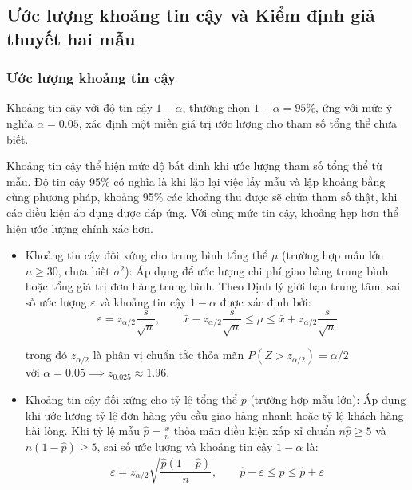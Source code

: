 	\subsection{Ước lượng khoảng tin cậy và Kiểm định giả thuyết hai mẫu}
	
	\subsubsection{Ước lượng khoảng tin cậy}
	
	Khoảng tin cậy với độ tin cậy $1 - \alpha$, thường chọn $1 - \alpha = 95\%$, ứng với mức ý nghĩa $\alpha = 0.05$, xác định một miền giá trị ước lượng cho tham số tổng thể chưa biết.
	
	Khoảng tin cậy thể hiện mức độ bất định khi ước lượng tham số tổng thể từ mẫu. Độ tin cậy 95\% có nghĩa là khi lặp lại việc lấy mẫu và lập khoảng bằng cùng phương pháp, khoảng 95\% các khoảng thu được sẽ chứa tham số thật, khi các điều kiện áp dụng được đáp ứng. Với cùng mức tin cậy, khoảng hẹp hơn thể hiện ước lượng chính xác hơn.
	
	\begin{itemize}
		\item Khoảng tin cậy đối xứng cho trung bình tổng thể $\mu$ (trường hợp mẫu lớn $n \ge 30$, chưa biết $\sigma^2$):
		Áp dụng để ước lượng chi phí giao hàng trung bình  hoặc tổng giá trị đơn hàng trung bình. Theo Định lý giới hạn trung tâm, sai số ước lượng $\varepsilon$ và khoảng tin cậy $1-\alpha$ được xác định bởi:
		\begin{equation}
			\varepsilon = z_{\alpha/2} \frac{s}{\sqrt{n}}, \qquad \bar{x} - z_{\alpha/2} \frac{s}{\sqrt{n}} \le \mu \le \bar{x} + z_{\alpha/2} \frac{s}{\sqrt{n}}
		\end{equation}
		\begin{center}
			trong đó $z_{\alpha/2}$ là phân vị chuẩn tắc thỏa mãn $P(Z > z_{\alpha/2}) = \alpha/2$ \\
			với $\alpha = 0.05 \implies z_{0.025} \approx 1.96$.
		\end{center}		
		
		
		\item Khoảng tin cậy đối xứng cho tỷ lệ tổng thể $p$ (trường hợp mẫu lớn):
		Áp dụng khi ước lượng tỷ lệ đơn hàng yêu cầu giao hàng nhanh hoặc tỷ lệ khách hàng hài lòng. Khi tỷ lệ mẫu $\hat{p} = \frac{x}{n}$ thỏa mãn điều kiện xấp xỉ chuẩn $n\hat{p} \ge 5$ và $n(1 - \hat{p}) \ge 5$, sai số ước lượng và khoảng tin cậy $1-\alpha$ là:
		\begin{equation}
			\varepsilon = z_{\alpha/2} \sqrt{\frac{\hat{p}(1 - \hat{p})}{n}}, \qquad \hat{p} - \varepsilon \le p \le \hat{p} + \varepsilon
		\end{equation}
		
		
	\end{itemize}
	
